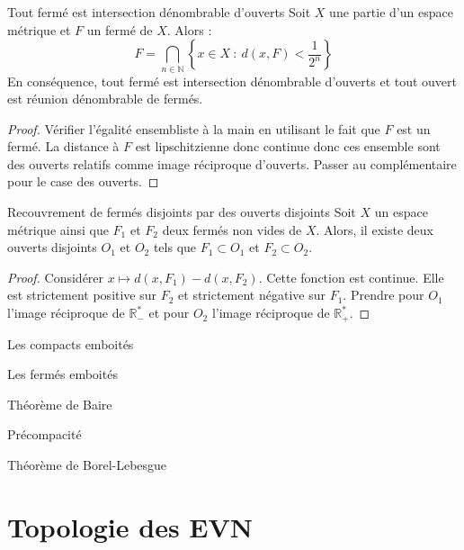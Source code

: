 \documentclass[french]{article}
\newcommand{\N}{\mathbb{N}}
\newcommand{\R}{\mathbb{R}}
\newcommand{\st}{^*}
\theoremstyle{theorem}
\theoremstyle{definition}
\begin{document}
\begin{lem}{Tout fermé est intersection dénombrable d'ouverts}
	Soit $X$ une partie d'un espace métrique et $F$ un fermé de $X$. Alors : $$F=\bigcap_{n\in\N}\left\{x\in X\ : \ d(x,F)<\frac{1}{2^n}\right\}$$ En conséquence, tout fermé est intersection dénombrable d'ouverts et tout ouvert est réunion dénombrable de fermés.
\end{lem}
\begin{proof}
	Vérifier l'égalité ensembliste à la main en utilisant le fait que $F$ est un fermé. La distance à $F$ est lipschitzienne donc continue donc ces ensemble sont des ouverts relatifs comme image réciproque d'ouverts. Passer au complémentaire pour le case des ouverts.
\end{proof}

\begin{lem}{Recouvrement de fermés disjoints par des ouverts disjoints}
	Soit $X$ un espace métrique ainsi que $F_1$ et $F_2$ deux fermés non vides de $X$. Alors, il existe deux ouverts disjoints $O_1$ et $O_2$ tels que $F_1\subset O_1$ et $F_2\subset O_2$.
\end{lem}
\begin{proof}
	Considérer $x\mapsto d(x,F_1)-d(x,F_2)$. Cette fonction est continue. Elle est strictement positive sur $F_2$ et strictement négative sur $F_1$. Prendre pour $O_1$ l'image réciproque de $\R_-\st$ et pour $O_2$ l'image réciproque de $\R_+\st$.
\end{proof}

\begin{lem}{Les compacts emboités}
	
\end{lem}

\begin{lem}{Les fermés emboités}
	
\end{lem}

\begin{lem}{Théorème de Baire}
	
\end{lem}

\begin{lem}{Précompacité}
	
\end{lem}

\begin{lem}{Théorème de Borel-Lebesgue}
	
\end{lem}

\section{Topologie des EVN}
\end{document}
